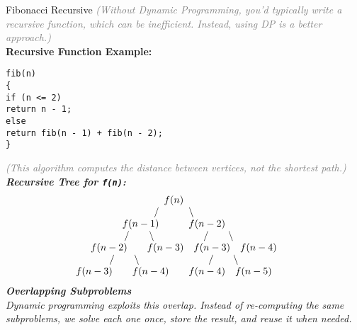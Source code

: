 \begin{frame}{Fibonacci Recursive}
\textit{\textcolor{gray}{(Without Dynamic Programming, you'd typically write a recursive function, which can be inefficient. Instead, using DP is a better approach.)}}\\
\vspace{1em}
    \textbf{Recursive Function Example:}

    \vspace{1em}
    \texttt{fib(n)} \\
    \texttt{\{} \\
    \hspace{1em} \texttt{if (n <= 2)} \\
    \hspace{2em} \texttt{return n - 1;} \\
    \hspace{1em} \texttt{else} \\
    \hspace{2em} \texttt{return fib(n - 1) + fib(n - 2);} \\
    \texttt{\}}

    \end{frame}
\begin{frame}
\itshape \textcolor{gray}{(This algorithm computes the distance between vertices, not the shortest path.)} \\
\vspace{1em}
\textbf{Recursive Tree for \texttt{f(n)}:}
\[
\hspace*{-2em} %
\begin{array}{c}
f(n) \\
\quad / \qquad \quad \backslash \quad \\
f(n-1) \qquad \quad f(n-2) \\
\quad \quad / \quad \quad \backslash \qquad \qquad \quad / \quad \quad \backslash \quad \\
\qquad f(n-2) \qquad f(n-3) \quad f(n-3) \quad f(n-4) \\
/ \quad \quad \backslash \quad \quad \quad \quad \quad \quad  \quad / \quad \quad \backslash \\
f(n-3) \quad \quad f(n-4) \quad \quad f(n-4) \quad f(n-5)
\end{array}
\]
\textbf{Overlapping Subproblems} \\
Dynamic programming exploits this overlap. Instead of re-computing the same subproblems, we solve each one once, store the result, and reuse it when needed.
\end{frame}

